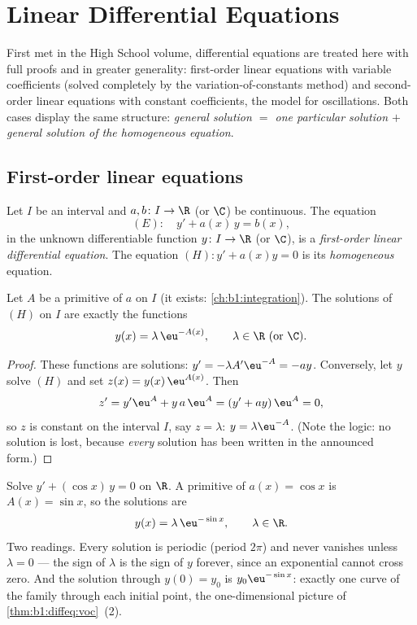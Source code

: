 \chapter{Linear Differential Equations}\label{ch:b1:diffeq}

First met in the High School volume, differential equations are treated
here with full proofs and in greater generality: first-order linear
equations with variable coefficients (solved completely by the
variation-of-constants method) and second-order linear equations with
constant coefficients, the model for oscillations. Both cases display
the same structure: \emph{general solution $=$ one particular solution
$+$ general solution of the homogeneous equation}.

\section{First-order linear equations}

\begin{definition}\label{def:b1:diffeq:linear1}
Let $I$ be an interval and $a, b \colon I \to \R$ (or $\C$) be
continuous. The equation
\[
(E)\colon\quad y' + a(x)\,y = b(x),
\]
in the unknown differentiable function $y \colon I \to \R$ (or $\C$),
is a \emph{first-order linear differential
equation}. The
equation $(H)\colon y' + a(x) y = 0$ is its \emph{homogeneous}
equation.
\end{definition}

\begin{theorem}\label{thm:b1:diffeq:homogeneous1}
Let $A$ be a primitive of $a$ on $I$ (it exists:
\cref{ch:b1:integration}). The solutions of $(H)$ on $I$ are exactly
the functions
\[
y(x) = \lambda\, \eu^{-A(x)}, \qquad \lambda \in \R \text{ (or } \C).
\]
\end{theorem}

\begin{proof}
These functions are solutions: $y' = -\lambda A' \eu^{-A} = -a y$.
Conversely, let $y$ solve $(H)$ and set $z(x) = y(x)\, \eu^{A(x)}$.
Then
\[
z' = y' \eu^{A} + y\, a\, \eu^{A} = (y' + ay)\, \eu^{A} = 0 ,
\]
so $z$ is constant on the interval $I$, say $z = \lambda$: $y =
\lambda \eu^{-A}$. (Note the logic: no solution is lost, because
\emph{every} solution has been written in the announced form.)
\end{proof}

\begin{example}\label{ex:b1:diffeq:varcoeff}
Solve $y' + (\cos x)\,y = 0$ on $\R$. A primitive of $a(x) =
\cos x$ is $A(x) = \sin x$, so the solutions are
\[
y(x) = \lambda\,\eu^{-\sin x}, \qquad \lambda \in \R .
\]
Two readings. Every solution is periodic (period $2\pi$) and never
vanishes unless $\lambda = 0$ --- the sign of $\lambda$ is the
sign of $y$ forever, since an exponential cannot cross zero. And
the solution through $y(0) = y_0$ is $y_0\eu^{-\sin x}$: exactly
one curve of the family through each initial point, the
one-dimensional picture of \cref{thm:b1:diffeq:voc}~(2).
\end{example}

